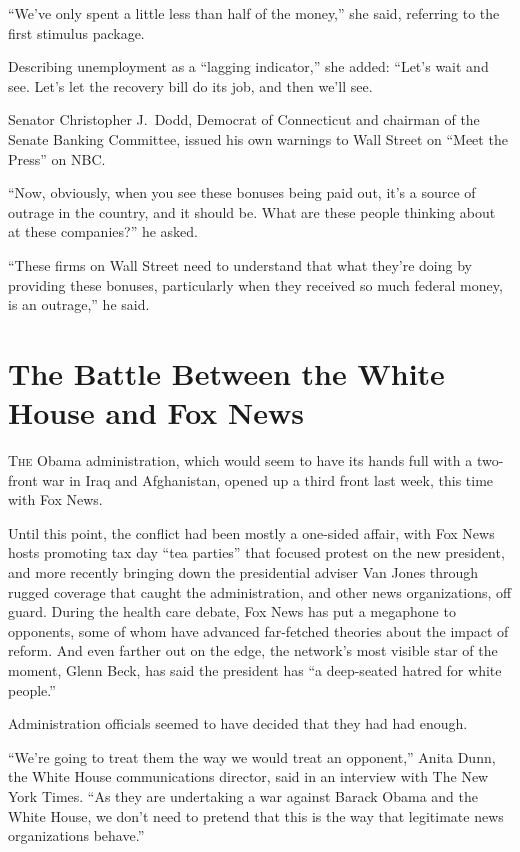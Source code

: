 ﻿\documentclass[12pt]{article}
\begin{document}
``We've only spent a little less than half of the money,'' she said, referring to the first stimulus
package.

Describing unemployment as a ``lagging indicator,'' she added: ``Let's wait and see. Let's let the
recovery bill do its job, and then we'll see.

Senator Christopher J.~Dodd, Democrat of Connecticut and chairman of the Senate Banking Committee,
issued his own warnings to Wall Street on ``Meet the Press'' on NBC.

``Now, obviously, when you see these bonuses being paid out, it's a source of outrage in the
country, and it should be. What are these people thinking about at these companies?'' he asked.

``These firms on Wall Street need to understand that what they're doing by providing these bonuses,
particularly when they received so much federal money, is an outrage,'' he said.

\section{The Battle Between the White House and Fox News}

\lettrine{T}{he} Obama administration, which would seem to have its hands
full with a two-front war in Iraq and Afghanistan, opened up a third front last week, this time with
Fox News.

Until this point, the conflict had been mostly a one-sided affair, with Fox News hosts promoting tax
day ``tea parties'' that focused protest on the new president, and more recently bringing down the
presidential adviser Van Jones through rugged coverage that caught the administration, and other
news organizations, off guard. During the health care debate, Fox News has put a megaphone to
opponents, some of whom have advanced far-fetched theories about the impact of reform. And even
farther out on the edge, the network's most visible star of the moment, Glenn Beck, has said the
president has ``a deep-seated hatred for white people.''

Administration officials seemed to have decided that they had had enough.

``We're going to treat them the way we would treat an opponent,'' Anita Dunn, the White House
communications director, said in an interview with The New York Times. ``As they are undertaking a
war against Barack Obama and the White House, we don't need to pretend that this is the way that
legitimate news organizations behave.''
\end{document}
